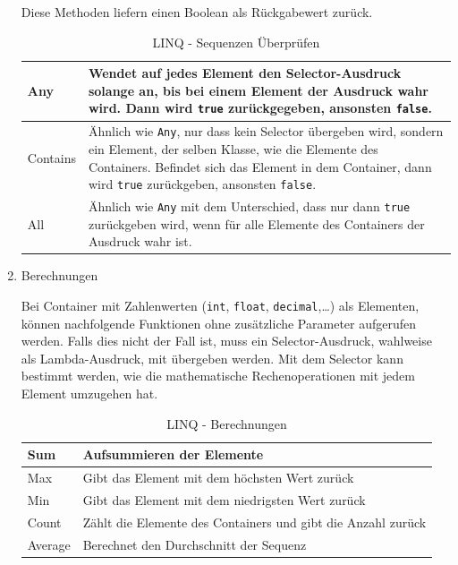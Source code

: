 \begin{enumerate}
Diese Methoden liefern einen Boolean als Rückgabewert zurück.

\bigskip
\begin{table}[H]
	\centering
\begin{tabularx}{\textwidth}{|p{130 pt}|X|}
		\hline
Any & Wendet auf jedes Element den Selector-Ausdruck solange an, bis bei einem Element der Ausdruck wahr wird. Dann wird \texttt{true} zurückgegeben, ansonsten \texttt{false}.\\	\hline
Contains & Ähnlich wie \texttt{Any}, nur dass kein Selector übergeben wird, sondern ein Element, der selben Klasse, wie die Elemente des Containers. Befindet sich das Element in dem Container, dann wird \texttt{true} zurückgeben, ansonsten \texttt{false}.\\	\hline
All & Ähnlich wie \texttt{Any} mit dem Unterschied, dass nur dann \texttt{true} zurückgeben wird, wenn für alle Elemente des Containers der Ausdruck wahr ist.\\	\hline
\end{tabularx}
	\medskip
	\caption{LINQ - Sequenzen Überprüfen}
\end{table}

\item Berechnungen

Bei Container mit Zahlenwerten (\texttt{int}, \texttt{float}, \texttt{decimal},\ldots{}) als Elementen,
können nachfolgende Funktionen ohne zusätzliche Parameter aufgerufen werden.
Falls dies nicht der Fall ist, muss ein Selector-Ausdruck, wahlweise als
Lambda-Ausdruck, mit übergeben werden. Mit dem Selector kann bestimmt werden, wie
die mathematische Rechenoperationen mit jedem Element umzugehen hat.

\bigskip
\begin{table}[H]
	\centering
\begin{tabularx}{\textwidth}{|p{130pt}|X|}
	\hline
Sum & Aufsummieren der Elemente\\ 	\hline
Max & Gibt das Element mit dem höchsten Wert zurück\\	\hline
Min & Gibt das Element mit dem niedrigsten Wert zurück\\ 	\hline
Count & Zählt die Elemente des Containers und gibt die Anzahl zurück\\	\hline
Average & Berechnet den Durchschnitt der Sequenz\\	\hline
\end{tabularx}
	\medskip
	\caption{LINQ - Berechnungen}
\end{table}


\end{enumerate}
